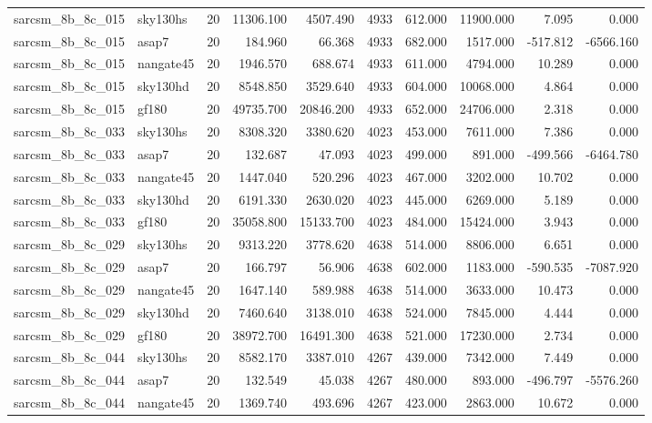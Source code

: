 \begin{longtable}{llrrrrrrrr}
sarcsm\_8b\_8c\_015 & sky130hs & 20 & 11306.100 & 4507.490 & 4933 & 612.000 & 11900.000 & 7.095 & 0.000 \\
sarcsm\_8b\_8c\_015 & asap7 & 20 & 184.960 & 66.368 & 4933 & 682.000 & 1517.000 & -517.812 & -6566.160 \\
sarcsm\_8b\_8c\_015 & nangate45 & 20 & 1946.570 & 688.674 & 4933 & 611.000 & 4794.000 & 10.289 & 0.000 \\
sarcsm\_8b\_8c\_015 & sky130hd & 20 & 8548.850 & 3529.640 & 4933 & 604.000 & 10068.000 & 4.864 & 0.000 \\
sarcsm\_8b\_8c\_015 & gf180 & 20 & 49735.700 & 20846.200 & 4933 & 652.000 & 24706.000 & 2.318 & 0.000 \\
sarcsm\_8b\_8c\_033 & sky130hs & 20 & 8308.320 & 3380.620 & 4023 & 453.000 & 7611.000 & 7.386 & 0.000 \\
sarcsm\_8b\_8c\_033 & asap7 & 20 & 132.687 & 47.093 & 4023 & 499.000 & 891.000 & -499.566 & -6464.780 \\
sarcsm\_8b\_8c\_033 & nangate45 & 20 & 1447.040 & 520.296 & 4023 & 467.000 & 3202.000 & 10.702 & 0.000 \\
sarcsm\_8b\_8c\_033 & sky130hd & 20 & 6191.330 & 2630.020 & 4023 & 445.000 & 6269.000 & 5.189 & 0.000 \\
sarcsm\_8b\_8c\_033 & gf180 & 20 & 35058.800 & 15133.700 & 4023 & 484.000 & 15424.000 & 3.943 & 0.000 \\
sarcsm\_8b\_8c\_029 & sky130hs & 20 & 9313.220 & 3778.620 & 4638 & 514.000 & 8806.000 & 6.651 & 0.000 \\
sarcsm\_8b\_8c\_029 & asap7 & 20 & 166.797 & 56.906 & 4638 & 602.000 & 1183.000 & -590.535 & -7087.920 \\
sarcsm\_8b\_8c\_029 & nangate45 & 20 & 1647.140 & 589.988 & 4638 & 514.000 & 3633.000 & 10.473 & 0.000 \\
sarcsm\_8b\_8c\_029 & sky130hd & 20 & 7460.640 & 3138.010 & 4638 & 524.000 & 7845.000 & 4.444 & 0.000 \\
sarcsm\_8b\_8c\_029 & gf180 & 20 & 38972.700 & 16491.300 & 4638 & 521.000 & 17230.000 & 2.734 & 0.000 \\
sarcsm\_8b\_8c\_044 & sky130hs & 20 & 8582.170 & 3387.010 & 4267 & 439.000 & 7342.000 & 7.449 & 0.000 \\
sarcsm\_8b\_8c\_044 & asap7 & 20 & 132.549 & 45.038 & 4267 & 480.000 & 893.000 & -496.797 & -5576.260 \\
sarcsm\_8b\_8c\_044 & nangate45 & 20 & 1369.740 & 493.696 & 4267 & 423.000 & 2863.000 & 10.672 & 0.000 \\

\end{longtable}
